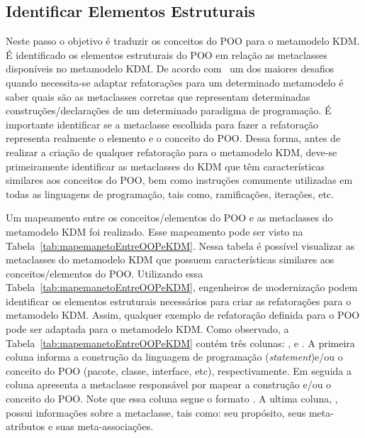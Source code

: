 \subsection{Identificar Elementos Estruturais}\label{sec:mapeamento_POO_e_KDM}

Neste passo o objetivo é traduzir os conceitos do POO para o metamodelo KDM. É identificado os elementos estruturais do POO em relação as metaclasses disponíveis no metamodelo KDM. De acordo com~ um dos maiores desafios quando necessita-se adaptar refatorações para um determinado metamodelo é saber quais são as metaclasses corretas que representam determinadas construções/declarações de um determinado paradigma de programação. É importante identificar se a metaclasse escolhida para fazer a refatoração representa realmente o elemento e o conceito do POO. Dessa forma, antes de realizar a criação de qualquer refatoração para o metamodelo KDM, deve-se primeiramente identificar as metaclasses do KDM que têm características similares aos conceitos do POO, bem como instruções comumente utilizadas em todas as linguagens de programação, tais como, ramificações, iterações, etc. 

Um mapeamento entre os conceitos/elementos do POO e as metaclasses do metamodelo KDM foi realizado. Esse mapeamento pode ser visto na Tabela~\ref{tab:mapemanetoEntreOOPeKDM}. Nessa tabela é possível visualizar as metaclasses do metamodelo KDM que possuem características similares aos conceitos/elementos do POO. Utilizando essa Tabela~\ref{tab:mapemanetoEntreOOPeKDM}, engenheiros de modernização podem identificar os elementos estruturais necessários para criar as refatorações para o metamodelo KDM. Assim, qualquer exemplo de refatoração definida para o POO pode ser adaptada para o metamodelo KDM. Como observado, a Tabela~\ref{tab:mapemanetoEntreOOPeKDM} contém três colunas: ,  e . A primeira coluna informa a construção da linguagem de programação (\textit{statement})e/ou o conceito do POO (pacote, classe, interface, etc), respectivamente. Em seguida a coluna  apresenta a metaclasse responsável por mapear a construção e/ou o conceito do POO. Note que essa coluna segue o formato . A ultima coluna, , possui informações sobre a metaclasse, tais como: seu propósito, seus meta-atributos e suas meta-associações.

